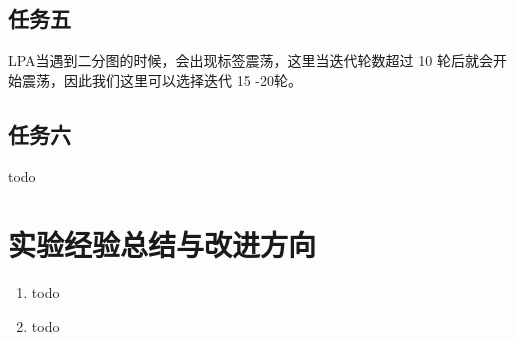 \documentclass[a4paper,UTF8]{article}
\numberwithin{equation}{section}
\begin{document}
\subsection{任务五}
LPA当遇到二分图的时候，会出现标签震荡，这里当迭代轮数超过 10 轮后就会开始震荡，因此我们这里可以选择迭代 15 -20轮。

\subsection{任务六}
todo
\section{实验经验总结与改进方向}
\begin{enumerate}[1)]
    \item todo
    \item todo
\end{enumerate}


\end{document}
